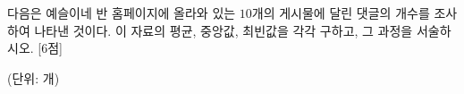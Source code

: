 다음은 예슬이네 반 홈페이지에 올라와 있는 $10$개의 게시물에 달린 댓글의 개수를 조사하여 나타낸 것이다. 이 자료의 평균, 중앙값, 최빈값을 각각 구하고, 그 과정을 서술하시오. \mbox{[6점]}\par\noindent\hfill{\footnotesize (단위: 개)}
